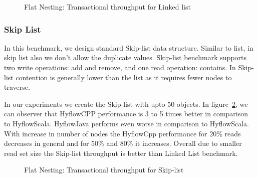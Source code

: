 \documentclass[12pt,english]{report}
\begin{document}
\begin{figure}[H]
\centering
{}
\end{figure}
\begin{figure}[H]
\centering
{}
\end{figure}
\begin{figure}[H]
\centering
{}
\caption{Flat Nesting: Transactional throughput for Linked list}
\label{Fig:flatList}
\end{figure}

\subsubsection{Skip List}

In this benchmark, we design standard Skip-list data structure. Similar to list, in skip list also we don't allow the duplicate values. Skip-list benchmark supports two write operations: add and remove, and one read operation: contains. In Skip-list contention is generally lower than the list as it requires fewer nodes to traverse. 

In our experiments we create the Skip-list with upto 50 objects. In figure~\ref{Fig:flatSkipList}, we can observer that HyflowCPP performance is 3 to 5 times better in comparison to HyflowScala. HyflowJava performs even worse in comparison to HyflowScala. With increase in number of nodes the HyflowCpp performance for 20\% reads decreases in general and for 50\% and 80\%  it increases. Overall due to smaller read set size the Skip-list throughput is better than Linked List benchmark. 

\begin{figure}[H]
\centering
{}
\end{figure}
\begin{figure}[H]
\centering
{}
\end{figure}
\begin{figure}[H]
\centering
{}
\caption{Flat Nesting: Transactional throughput for Skip-list}
\label{Fig:flatSkipList}
\end{figure}
\end{document}

